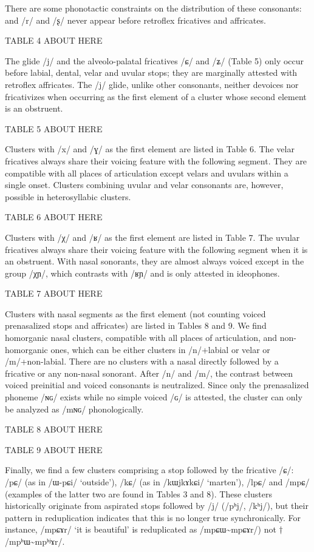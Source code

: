 \documentclass[12pt]{article}
\newcommand{\ipa}[1]{\mbox{\phon/#1/}}
\newcommand{\phonet}[1]{\mbox{\phon[#1]}}
\newcommand{\tld}{\textasciitilde{}}
\begin{document}
 There are some phonotactic constraints on the distribution of these consonants:   and \ipa{r} and \ipa{ʂ} never appear before retroflex fricatives and affricates.  
 
TABLE 4 ABOUT HERE
 
  The glide \ipa{j}  and the alveolo-palatal fricatives \ipa{ɕ} and \ipa{ʑ} (Table 5) only occur before labial, dental, velar and uvular stops; they are marginally attested with retroflex affricates. The \ipa{j} glide, unlike other consonants, neither devoices nor fricativizes when occurring as the first element of a cluster whose second element is an obstruent.

TABLE 5 ABOUT HERE 

  Clusters with \ipa{x} and \ipa{ɣ}  as the first element are listed in Table 6. The velar fricatives  always share their voicing feature with the following segment. They are compatible with all places of articulation except velars and uvulars within a single onset. Clusters combining uvular and velar consonants are, however, possible in heterosyllabic clusters.

TABLE 6 ABOUT HERE   

  Clusters with \ipa{χ} and  \ipa{ʁ} as the first element are listed in Table 7. The uvular fricatives  always share their voicing feature with the following segment when it is an obstruent. With nasal sonorants, they are  almost always voiced except in the group \ipa{χɲ}, which contrasts with \ipa{ʁɲ} and is only attested in ideophones.
  
TABLE 7 ABOUT HERE   
  
  Clusters with nasal segments as the first element (not counting voiced prenasalized stops and affricates) are listed in Tables 8 and 9. We find homorganic nasal clusters, compatible with all places of articulation, and non-homorganic ones, which can be either clusters in \ipa{n}+labial or velar or \ipa{m}+non-labial. There are no clusters with a nasal directly followed by a fricative or any non-nasal sonorant. After \ipa{n} and \ipa{m}, the contrast between voiced preinitial and voiced consonants is neutralized. Since only the prenasalized phoneme \ipa{ɴɢ} exists while no simple voiced \ipa{ɢ} is attested, the cluster \phonet{mɢ} can only be analyzed as \ipa{mɴɢ} phonologically.

TABLE 8 ABOUT HERE   
 
TABLE 9 ABOUT HERE   

Finally, we find a few clusters comprising a stop followed by the fricative \ipa{ɕ}:  \ipa{pɕ}  (as in \ipa{ɯ-pɕi}  `outside'),  \ipa{kɕ}  (as in \ipa{kɯjkɤkɕi}  `marten'), \ipa{lpɕ} and \ipa{mpɕ} (examples of the latter two are found in Tables 3 and  8). These clusters historically originate from aspirated stops followed by \ipa{j} (\ipa{pʰj}, \ipa{kʰj}), but their pattern in reduplication indicates that this is no longer true synchronically. For instance, \ipa{mpɕɤr} `it is beautiful' is reduplicated as \ipa{mpɕɯ\tld{}mpɕɤr}) not $\dagger$\ipa{mpʰɯ\tld{}mpʰʲɤr}.
\end{document}

